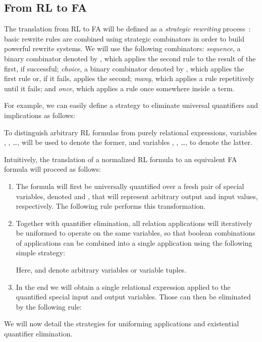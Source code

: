 \documentclass{llncs}
\begin{document}
\subsection{From RL to FA}
\label{sec:trpwpf}

The translation from RL to FA will be defined as a \emph{strategic
  rewriting} process~\cite{sw}: basic rewrite rules are combined using
strategic combinators in order to build powerful rewrite systems. We
will use the following combinators: \emph{sequence}, a binary
combinator denoted by , which applies the second rule
to the result of the first, if successful; \emph{choice}, a binary
combinator denoted by , which applies the first rule or, if it
fails, applies the second; \emph{many}, which applies a rule
repetitively until it fails; and \emph{once}, which applies a rule once
somewhere inside a term.

For example, we can easily define a strategy to eliminate universal
quantifiers and implications as follows:


To distinguish arbitrary RL formulas from purely relational
expressions, variables , , \ldots, will be used to denote
the former, and variables , , \ldots, to denote the latter.

Intuitively, the translation of a normalized RL formula to an
equivalent FA formula will proceed as follows:
\begin{enumerate}
\item The formula will first be universally quantified over a fresh
  pair of special variables, denoted  and , that will represent
  arbitrary output and input values, respectively. The following rule
  performs this transformation.
  
\item Together with quantifier elimination, all relation applications
  will iteratively be uniformed to operate on the same variables, so
  that boolean combinations of applications can be combined into a
  single application using the following simple strategy:
  
  
  Here,  and  denote arbitrary variables or variable tuples.
\item In the end we will obtain a single relational expression applied
  to the quantified special input and output variables. Those can then
  be eliminated by the following rule:
  

\end{enumerate}
We will now detail the strategies for uniforming applications and
existential quantifier elimination.
\end{document}
